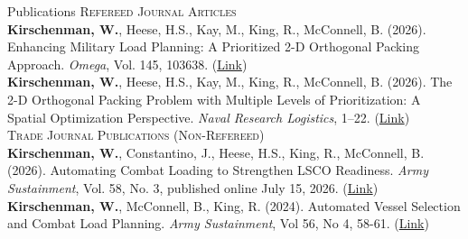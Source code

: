 \documentclass[
	11pt,
]{resume}
\begin{document}
\begin{rSection}{Publications}
    \textsc{Refereed Journal Articles} \medskip \\
    \textbf{Kirschenman, W.}, Heese, H.S., Kay, M., King, R., McConnell, B. (2026). Enhancing Military Load Planning: A Prioritized 2-D Orthogonal Packing Approach. \textit{Omega}, Vol. 145, 103638. (\href{https://doi.org/10.1016/j.omega.2026.103638}{Link}) \medskip \\
    \textbf{Kirschenman, W.}, Heese, H.S., Kay, M., King, R., McConnell, B. (2026). The 2-D Orthogonal Packing Problem with Multiple Levels of Prioritization: A Spatial Optimization Perspective. \textit{Naval Research Logistics}, 1--22. (\href{https://doi.org/10.1002/nav.70087}{Link}) \medskip \\

    \textsc{Trade Journal Publications (Non-Refereed)} \medskip \\
    \textbf{Kirschenman, W.}, Constantino, J., Heese, H.S., King, R., McConnell, B. (2026). Automating Combat Loading to Strengthen LSCO Readiness. \textit{Army Sustainment}, Vol. 58, No. 3, published online July 15, 2026. (\href{https://www.lib.ncsu.edu/resolver/1840.20/46886}{Link}) \medskip
    \\
    \textbf{Kirschenman, W.}, McConnell, B., King, R. (2024). Automated Vessel Selection and Combat Load Planning. \textit{Army Sustainment}, Vol 56, No 4, 58-61. (\href{https://www.lib.ncsu.edu/resolver/1840.20/44301}{Link})
\end{rSection}
\end{document}

